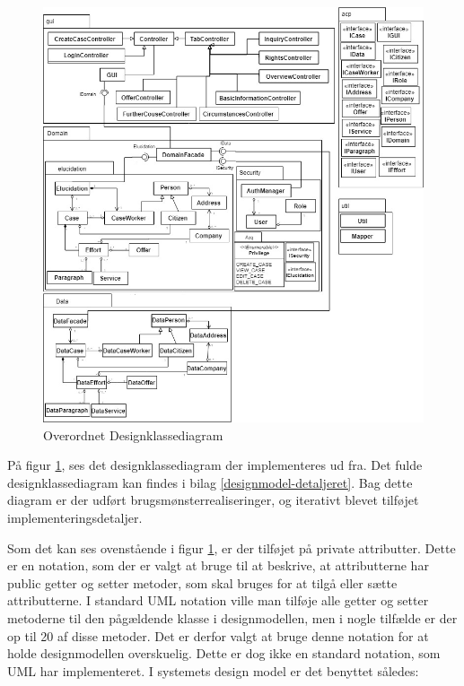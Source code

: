 \documentclass[../../main.tex]{subfiles}
\begin{document}
\begin{figure}[H]
  \centering
  \includegraphics[scale=.45]{figurer/over-design-diagram.jpg}
  \caption{Overordnet Designklassediagram}
  \label{fig:over-designklassediagram}
\end{figure}

På figur \ref{fig:over-designklassediagram}, ses det designklassediagram der implementeres ud fra. Det fulde designklassediagram kan findes i bilag \ref{designmodel-detaljeret}. Bag dette diagram er der udført brugsmønsterrealiseringer, og iterativt blevet tilføjet implementeringsdetaljer. 

Som det kan ses ovenstående i figur \ref{fig:over-designklassediagram}, er der tilføjet  på private attributter. Dette er en notation, som der er valgt at bruge til at beskrive, at attributterne har public getter og setter metoder, som skal bruges for at tilgå eller sætte attributterne. I standard UML notation ville man tilføje alle getter og setter metoderne til den pågældende klasse i designmodellen, men i nogle tilfælde er der op til 20 af disse metoder. Det er derfor valgt at bruge denne notation for at holde designmodellen overskuelig. Dette er dog ikke en standard notation, som UML har implementeret. I systemets design model er det benyttet således:
\end{document}
